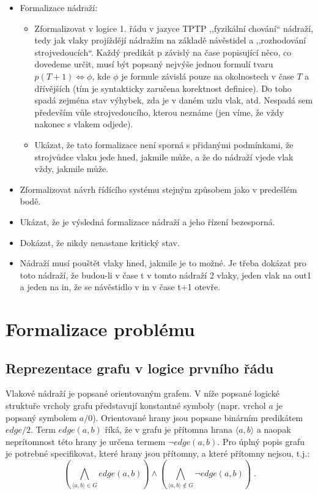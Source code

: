 \documentclass[a4paper,journal]{IEEEtran}
\begin{document}
\begin{itemize}
	\item Formalizace nádraží:
	\begin{itemize}
		\item Zformalizovat v logice 1. řádu v jazyce TPTP ,,fyzikální chování`` nádraží, 
		tedy jak vlaky projíždějí nádražím na základě návěstidel a ,,rozhodování strojvedoucích``. 
		Každý predikát p závislý na čase popisující něco, co dovedeme určit, musí být popsaný nejvýše 
		jednou formulí tvaru $p(T+1) \Leftrightarrow \phi$, kde $\phi$ je formule závislá pouze 
		na okolnostech v čase $T$ a dřívějších (tím je syntakticky zaručena korektnost definice).
		Do toho spadá zejména stav výhybek, zda je v daném uzlu vlak, atd. 
		Nespadá sem především vůle strojvedoucího, kterou neznáme
		(jen víme, že vždy nakonec s vlakem odjede).
		\item Ukázat, že tato formalizace není sporná s přidanými podmínkami, že strojvůdce vlaku jede hned,
		jakmile může, a že do nádraží vjede vlak vždy, jakmile může.
	\end{itemize}
	\item Zformalizovat návrh řídícího systému stejným způsobem jako v predešlém bodě.
	\item Ukázat, že je výsledná formalizace nádraží a jeho řízení bezesporná.
	\item Dokázat, že nikdy nenastane kritický stav.
	\item Nádraží musí pouštět vlaky hned, jakmile je to možné. 
	Je třeba dokázat pro toto nádraží, že budou-li v čase t v tomto nádraží 2 vlaky, 
	jeden vlak na out1 a jeden na in, že se návěstidlo v in v čase t+1 otevře.
\end{itemize}


\section{Formalizace problému}\label{sec:formal}
\subsection{Reprezentace grafu v logice prvního řádu}
Vlakové nádraží je popsané orientovaným grafem. V níže popsané logické struktuře vrcholy grafu
představují konstantné symboly (napr. vrchol $a$ je popsaný symbolem $a/0$).
Orientované hrany jsou popsane binárním predikátem $edge/2$. Term $edge(a,b)$ říká, že v grafu je přítomna 
hrana $\langle a,b\rangle$ a naopak neprítomnost této hrany je určena termem $\neg edge(a,b)$.
Pro úplný popis grafu je potrebné specifikovat, které hrany jsou přítomny, a které přítomny nejsou,
t.j.:
\begin{equation}
\left( \bigwedge_{\langle a,b\rangle\in G}{edge(a,b)} \right) \wedge 
\left( \bigwedge_{\langle a,b\rangle\not\in G}{\neg edge(a,b)} \right)\;.
\end{equation}
\end{document}
